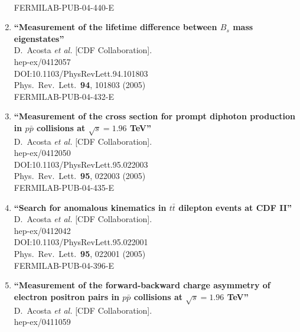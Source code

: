 \documentclass{article}
\begin{document}
\begin{enumerate}
  \\{}FERMILAB-PUB-04-440-E
\item%
{\bf ``Measurement of the lifetime difference between $B_s$ mass eigenstates''}
  \\{}D.~Acosta {\it et al.} [CDF Collaboration].
  \\{}hep-ex/0412057
  \\{}DOI:10.1103/PhysRevLett.94.101803
  \\{}Phys.\ Rev.\ Lett.\  {\bf 94}, 101803 (2005)
  \\{}FERMILAB-PUB-04-432-E
\item%
{\bf ``Measurement of the cross section for prompt diphoton production in $p\bar{p}$ collisions at $\sqrt{s} = 1.96$ TeV''}
  \\{}D.~Acosta {\it et al.} [CDF Collaboration].
  \\{}hep-ex/0412050
  \\{}DOI:10.1103/PhysRevLett.95.022003
  \\{}Phys.\ Rev.\ Lett.\  {\bf 95}, 022003 (2005)
  \\{}FERMILAB-PUB-04-435-E
\item%
{\bf ``Search for anomalous kinematics in $t\bar{t}$ dilepton events at {CDF} II''}
  \\{}D.~Acosta {\it et al.} [CDF Collaboration].
  \\{}hep-ex/0412042
  \\{}DOI:10.1103/PhysRevLett.95.022001
  \\{}Phys.\ Rev.\ Lett.\  {\bf 95}, 022001 (2005)
  \\{}FERMILAB-PUB-04-396-E
\item%
{\bf ``Measurement of the forward-backward charge asymmetry of electron positron pairs in $p\bar{p}$ collisions at $\sqrt{s} = 1.96$ TeV''}
  \\{}D.~Acosta {\it et al.} [CDF Collaboration].
  \\{}hep-ex/0411059

\end{enumerate}
\end{document}
